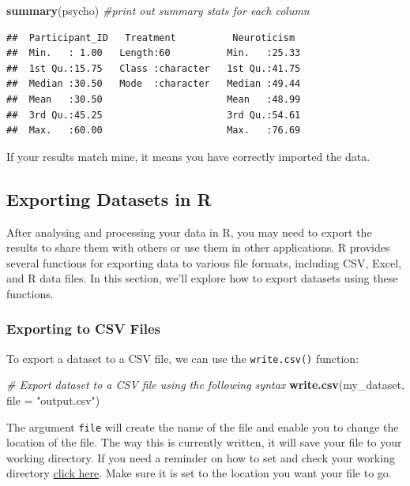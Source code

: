 \documentclass[
]{book}
\newenvironment{Shaded}{\begin{snugshade}}{\end{snugshade}}
\newcommand{\AttributeTok}[1]{\textcolor[rgb]{0.13,0.29,0.53}{#1}}
\newcommand{\CommentTok}[1]{\textcolor[rgb]{0.56,0.35,0.01}{\textit{#1}}}
\newcommand{\FunctionTok}[1]{\textcolor[rgb]{0.13,0.29,0.53}{\textbf{#1}}}
\newcommand{\NormalTok}[1]{#1}
\newcommand{\StringTok}[1]{\textcolor[rgb]{0.31,0.60,0.02}{#1}}
\begin{document}
\begin{Shaded}
\begin{Highlighting}[]
\FunctionTok{summary}\NormalTok{(psycho) }\CommentTok{\#print out summary stats for each column}
\end{Highlighting}
\end{Shaded}

\begin{verbatim}
##  Participant_ID   Treatment          Neuroticism   
##  Min.   : 1.00   Length:60          Min.   :25.33  
##  1st Qu.:15.75   Class :character   1st Qu.:41.75  
##  Median :30.50   Mode  :character   Median :49.44  
##  Mean   :30.50                      Mean   :48.99  
##  3rd Qu.:45.25                      3rd Qu.:54.61  
##  Max.   :60.00                      Max.   :76.69
\end{verbatim}

If your results match mine, it means you have correctly imported the data.

\subsection{Exporting Datasets in R}\label{exporting-datasets-in-r}

After analysing and processing your data in R, you may need to export the results to share them with others or use them in other applications. R provides several functions for exporting data to various file formats, including CSV, Excel, and R data files. In this section, we'll explore how to export datasets using these functions.

\subsubsection{Exporting to CSV Files}\label{exporting-to-csv-files}

To export a dataset to a CSV file, we can use the \texttt{write.csv()} function:

\begin{Shaded}
\begin{Highlighting}[]
\CommentTok{\# Export dataset to a CSV file using the following syntax}
\FunctionTok{write.csv}\NormalTok{(my\_dataset, }\AttributeTok{file =} \StringTok{"output.csv"}\NormalTok{)}
\end{Highlighting}
\end{Shaded}

The argument \texttt{file} will create the name of the file and enable you to change the location of the file. The way this is currently written, it will save your file to your working directory. If you need a reminder on how to set and check your working directory \hyperref[set_wd]{click here}. Make sure it is set to the location you want your file to go.
\end{document}
